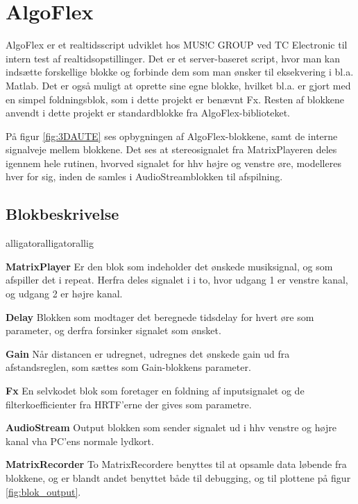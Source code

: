 \section{AlgoFlex}
\label{sec:AlgoFlex}

AlgoFlex er et realtidsscript udviklet hos MUS!C GROUP ved TC Electronic til intern test af realtidsopstillinger. Det er et server-baseret script, hvor man kan indsætte forskellige blokke og forbinde dem som man ønsker til eksekvering i bl.a. Matlab. Det er også muligt at oprette sine egne blokke, hvilket bl.a. er gjort med en simpel foldningsblok, som i dette projekt er benævnt Fx.%
Resten af blokkene anvendt i dette projekt er standardblokke fra AlgoFlex-biblioteket.


På figur \ref{fig:3DAUTE} ses opbygningen af AlgoFlex-blokkene, samt de interne signalveje mellem blokkene. Det ses at stereosignalet fra MatrixPlayeren deles igennem hele rutinen, hvorved signalet for hhv højre og venstre øre, modelleres hver for sig, inden de samles i AudioStreamblokken til afspilning. 

\subsection{Blokbeskrivelse}

\begin{labeling}{alligatoralligatorallig}
	\item[\textbf{MatrixPlayer}] Er den blok som indeholder det ønskede musiksignal, og som afspiller det i repeat. Herfra deles signalet i i to, hvor udgang 1 er venstre kanal, og udgang 2 er højre kanal.
	\item[\textbf{Delay}] Blokken som modtager det beregnede tidsdelay for hvert øre som parameter, og derfra forsinker signalet som ønsket.
	\item [\textbf{Gain}] Når distancen er udregnet, udregnes det ønskede gain ud fra afstandsreglen, som sættes som Gain-blokkens parameter. 
	\item[\textbf{Fx}] En selvkodet blok som foretager en foldning af inputsignalet og de filterkoefficienter fra HRTF'erne der gives som parametre. 
	
	\item[\textbf{AudioStream}] Output blokken som sender signalet ud i hhv venstre og højre kanal vha PC'ens normale lydkort. 
	\item[\textbf{MatrixRecorder}] To MatrixRecordere benyttes til at opsamle data løbende fra blokkene, og er blandt andet benyttet både til debugging, og til plottene på figur \ref{fig:blok_output}.
	
\end{labeling}



